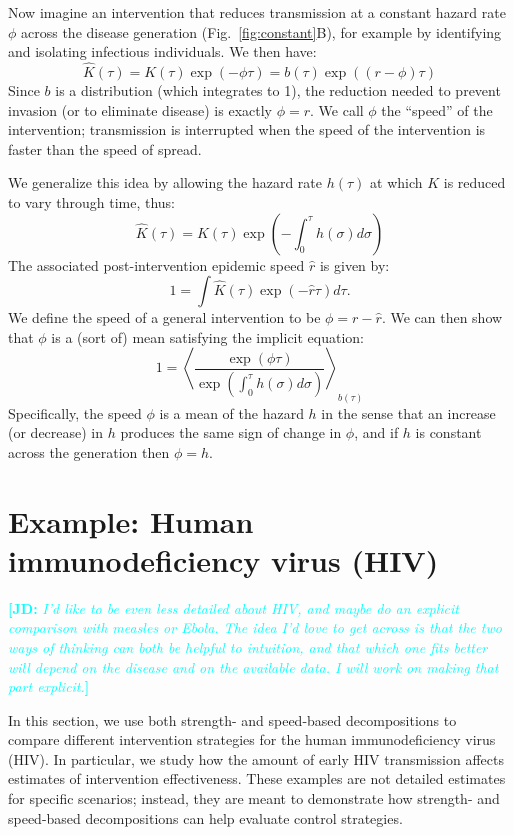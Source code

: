 \documentclass[12pt]{article}
\newcommand{\comment}[3]{\textcolor{#1}{\textbf{[#2: }\textit{#3}\textbf{]}}}
\newcommand{\jd}[1]{\comment{cyan}{JD}{#1}}
\newcommand{\figref}[1]{Fig.~\ref{fig:#1}}
\newcommand{\eqlab}[1]{\label{eq:#1}}
\begin{document}
Now imagine an intervention that reduces transmission at a constant hazard rate $\phi$ across the disease generation (\figref{constant}B), for example by identifying and isolating infectious individuals.
We then have:
\begin{equation}
	\hat K(\tau) = K(\tau)\exp(-\phi\tau) = b(\tau)\exp((r-\phi)\tau)
\end{equation}
Since $b$ is a distribution (which integrates to 1), the reduction needed to prevent invasion (or to eliminate disease)  is exactly $\phi=r$. 
We call $\phi$ the ``speed'' of the intervention; transmission is interrupted when the speed of the intervention is faster than the speed of spread.

We generalize this idea by allowing the hazard rate $h(\tau)$ at which $K$ is reduced to vary through time, thus:
\begin{equation}
	\hat K(\tau) = K(\tau) \exp\left(-\int_0^\tau h(\sigma) d\sigma\right)
\end{equation}
The associated post-intervention epidemic speed $\hat r$ is given by:
\begin{equation}
	1 = \int \hat K(\tau) \exp(-\hat r\tau) d\tau.	
\end{equation}
We define the speed of a general intervention to be $\phi = r - \hat r$. 
We can then show that $\phi$ is a (sort of) mean satisfying the implicit equation:
\begin{equation}
	1 = \left\langle \frac{\exp(\phi \tau) }{\exp\left(\int_0^\tau h(\sigma) d\sigma\right)} \right\rangle_{b(\tau)}
	\eqlab{speedMean}
\end{equation}
Specifically, the speed $\phi$ is a mean of the hazard $h$ in the sense that an increase (or decrease) in $h$ produces the same sign of change in $\phi$, and if $h$ is constant across the generation then $\phi=h$.

\section{Example: Human immunodeficiency virus (HIV)}

\jd{I'd like to be even less detailed about HIV, and maybe do an explicit comparison with measles or Ebola. The idea I'd love to get across is that the two ways of thinking can both be helpful to intuition, and that which one fits better will depend on the disease and on the available data. I will work on making that part explicit.}

In this section, we use both strength- and speed-based decompositions to compare different intervention strategies for the human immunodeficiency virus (HIV). 
In particular, we study how the amount of early HIV transmission affects estimates of intervention effectiveness. 
These examples are not detailed estimates for specific scenarios; 
instead, they are meant to demonstrate how strength- and speed-based decompositions can help evaluate control strategies.
\end{document}
